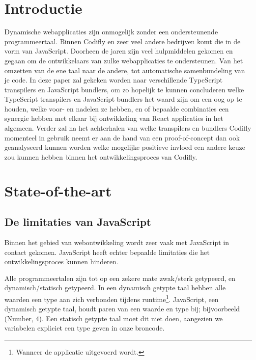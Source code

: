 \setlength{\parskip}{0.2em}

\section{Introductie} %
\label{sec:introductie}
Dynamische webapplicaties zijn onmogelijk zonder een ondersteunende programmeertaal. Binnen Codifly en zeer veel andere bedrijven komt die in de vorm van JavaScript. Doorheen de jaren zijn veel hulpmiddelen gekomen en gegaan om de ontwikkelaars van zulke webapplicaties te ondersteunen. Van het omzetten van de ene taal naar de andere, tot automatische samenbundeling van je code. In deze paper zal gekeken worden naar verschillende TypeScript transpilers en JavaScript bundlers, om zo hopelijk te kunnen concluderen welke TypeScript transpilers en JavaScript bundlers het waard zijn om een oog op te houden, welke voor- en nadelen ze hebben, en of bepaalde combinaties een synergie hebben met elkaar bij ontwikkeling van React applicaties in het algemeen. Verder zal na het achterhalen van welke transpilers en bundlers Codifly momenteel in gebruik neemt er aan de hand van een proof-of-concept dan ook geanalyseerd kunnen worden welke mogelijke positieve invloed een andere keuze zou kunnen hebben binnen het ontwikkelingsproces van Codifly.


\section{State-of-the-art}
\label{sec:state-of-the-art}

\subsection{De limitaties van JavaScript}
Binnen het gebied van webontwikkeling wordt zeer vaak met JavaScript in contact gekomen. JavaScript heeft echter bepaalde limitaties die het ontwikkelingsproces kunnen hinderen. \autocite{geeksforgeeks_2021}

Alle programmeertalen zijn tot op een zekere mate zwak/sterk getypeerd, en dynamisch/statisch getypeerd. In een dynamisch getypte taal hebben alle waarden een type aan zich verbonden tijdens runtime\footnote{Wanneer de applicatie uitgevoerd wordt.}. JavaScript, een dynamisch getypte taal, houdt paren van een waarde en type bij; bijvoorbeeld (Number, 4). Een statisch getypte taal moet dit niet doen, aangezien we variabelen expliciet een type geven in onze broncode.

